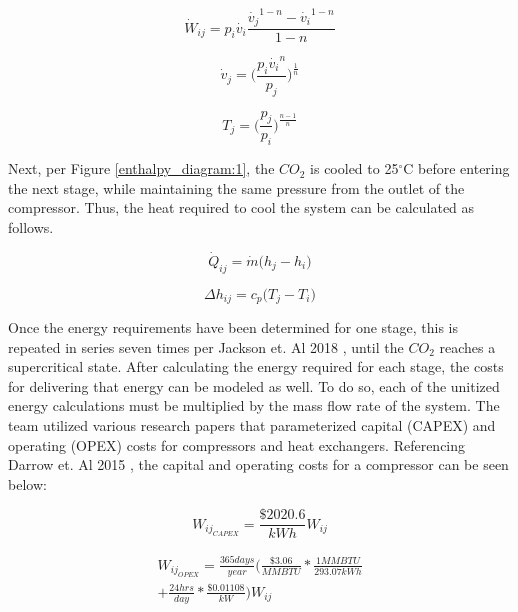 \documentclass[balance,upint,subscriptcorrection,varvw,mathalfa=cal=boondoxo,spanish,french,vietnamese,russian,greek,pdf-a,colorlinks]{asmeconf}
\begin{document}
\begin{equation}
    \dot{W}_{ij} = p_i \dot{v_i} \frac{\dot{v_j}^{1-n}-\dot{v_i} ^{1-n}}{1-n} 
\end{equation}

\begin{equation}
    \dot{v}_j = \bigg(\frac{p_i \dot{v_i}^n}{p_j}\bigg)^\frac{1}{n} 
\end{equation}

\begin{equation}
    T_j = \bigg(\frac{p_j}{p_i}\bigg)^\frac{n-1}{n} 
\end{equation}

Next, per Figure \ref{enthalpy_diagram:1}, the \begin{math}{CO_2} \end{math} is cooled to 25$^{\circ}$C before entering the next stage, while maintaining the same pressure from the outlet of the compressor. Thus, the heat required to cool the system can be calculated as follows.

\begin{equation}
    \dot{Q}_{ij} = \dot{m} \big(h_j-h_i)
\end{equation}

\begin{equation}
    \Delta h_{ij} = c_p\big(T_j-T_i)
\end{equation}

Once the energy requirements have been determined for one stage, this is repeated in series seven times per Jackson et. Al 2018 \cite{jackson_2018}, until the \begin{math}{CO_2} \end{math} reaches a supercritical state. 
After calculating the energy required for each stage, the costs for delivering that energy can be modeled as well. To do so, each of the unitized energy calculations must be multiplied by the mass flow rate of the system. The team utilized various research papers that parameterized capital (CAPEX) and operating (OPEX) costs for compressors and heat exchangers. Referencing Darrow et. Al 2015 \cite{darrow}, the capital and operating costs for a compressor can be seen below:

\begin{equation}
    W_{ij_{CAPEX}} = \frac{\$2020.6}{kWh}W_{ij}
\end{equation}

\begin{equation}
    \begin{array}{l}
        W_{ij_{OPEX}} = \frac{365 days}{year}\bigg(\frac{\$3.06}{MMBTU}*\frac{1 MMBTU}{293.07 kWh} \\
        + \frac{24 hrs}{day}*\frac{\$0.01108}{kW}\bigg)W_{ij}
    \end{array}
\end{equation}
\end{document}

